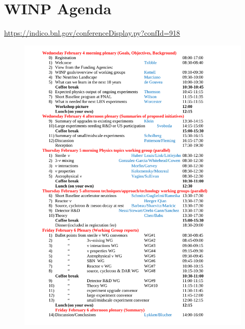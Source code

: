 \section{WINP Agenda}
\label{sec:Agenda}
\url{https://indico.bnl.gov/conferenceDisplay.py?confId=918}
\begin{figure}[h] 
\includegraphics[height=0.9\textheight]{WINP_Agenda_v12.pdf}
\end{figure}
